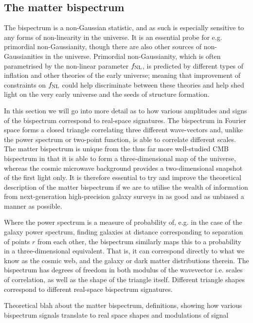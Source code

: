 \subsection{The matter bispectrum}

The bispectrum is a non-Gaussian statistic, and as such is especially sensitive to any forms of non-linearity in the universe. It is an essential probe for e.g. primordial non-Gaussianity, though there are also other sources of non-Gaussianities in the universe. Primordial non-Gaussianity, which is often parametrised by the non-linear parameter $f_\text{NL}$, is predicted by different types of inflation and other theories of the early universe; meaning that improvement of constraints on $f_\text{NL}$ could help discriminate between these theories and help shed light on the very early universe and the seeds of structure formation. 

In this section we will go into more detail as to how various amplitudes and signs of the bispectrum correspond to real-space signatures. The bispectrum in Fourier space forms a closed triangle correlating three different wave-vectors and, unlike the power spectrum or two-point function, is able to correlate different scales. The matter bispectrum is unique from the thus far more well-studied CMB bispectrum in that it is able to form a three-dimensional map of the universe, whereas the cosmic microwave background provides a two-dimensional snapshot of the first light only. It is therefore essential to try and improve the theoretical description of the matter bispectrum if we are to utilise the wealth of information from next-generation high-precision galaxy surveys in as good and as unbiased a manner as possible. 

Where the power spectrum is a measure of probability of, e.g. in the case of the galaxy power spectrum, finding galaxies at distance corresponding to separation of points $r$ from each other, the bispectrum similarly maps this to a probability in a three-dimensional equivalent. That is, it can correspond directly to what we know as the cosmic web, and the galaxy or dark matter distributions therein. The bispectrum has degrees of freedom in both modulus of the wavevector i.e. scales of correlation, as well as the shape of the triangle itself. Different triangle shapes correspond to different real-space bispectrum signatures.

Theoretical blah about the matter bispectrum, definitions, showing how various bispectrum signals translate to real space shapes and modulations of signal

